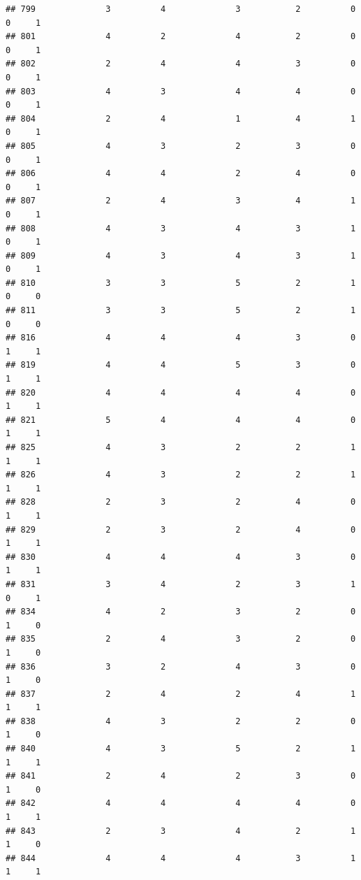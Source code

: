 \documentclass[
]{article}
\begin{document}
\begin{verbatim}
## 799              3          4              3           2          0    0     1
## 801              4          2              4           2          0    0     1
## 802              2          4              4           3          0    0     1
## 803              4          3              4           4          0    0     1
## 804              2          4              1           4          1    0     1
## 805              4          3              2           3          0    0     1
## 806              4          4              2           4          0    0     1
## 807              2          4              3           4          1    0     1
## 808              4          3              4           3          1    0     1
## 809              4          3              4           3          1    0     1
## 810              3          3              5           2          1    0     0
## 811              3          3              5           2          1    0     0
## 816              4          4              4           3          0    1     1
## 819              4          4              5           3          0    1     1
## 820              4          4              4           4          0    1     1
## 821              5          4              4           4          0    1     1
## 825              4          3              2           2          1    1     1
## 826              4          3              2           2          1    1     1
## 828              2          3              2           4          0    1     1
## 829              2          3              2           4          0    1     1
## 830              4          4              4           3          0    1     1
## 831              3          4              2           3          1    0     1
## 834              4          2              3           2          0    1     0
## 835              2          4              3           2          0    1     0
## 836              3          2              4           3          0    1     0
## 837              2          4              2           4          1    1     1
## 838              4          3              2           2          0    1     0
## 840              4          3              5           2          1    1     1
## 841              2          4              2           3          0    1     0
## 842              4          4              4           4          0    1     1
## 843              2          3              4           2          1    1     0
## 844              4          4              4           3          1    1     1

\end{verbatim}
\end{document}
